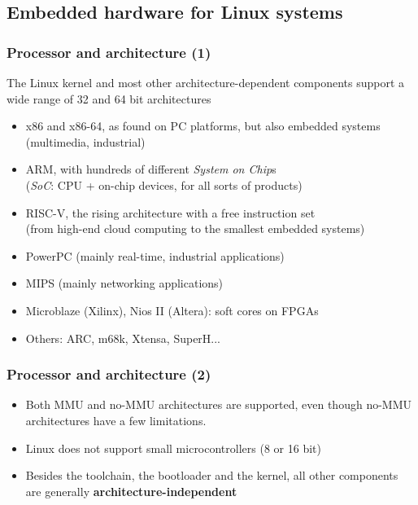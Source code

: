 \subsection{Embedded hardware for Linux systems}

\begin{frame}
  \frametitle{Processor and architecture (1)}
  The Linux kernel and most other architecture-dependent
  components support a wide range of 32 and 64 bit architectures
  \begin{itemize}
  \item x86 and x86-64, as found on PC platforms, but also embedded systems
    (multimedia, industrial)
  \item ARM, with hundreds of different {\em System on Chip}s\\
        ({\em SoC}: CPU + on-chip devices, for all sorts of products)
  \item RISC-V, the rising architecture with a free instruction set\\
        (from high-end cloud computing to the smallest embedded systems)
  \item PowerPC (mainly real-time, industrial applications)
  \item MIPS (mainly networking applications)
  \item Microblaze (Xilinx), Nios II (Altera): soft cores on FPGAs
  \item Others: ARC, m68k, Xtensa, SuperH...
  \end{itemize}
\end{frame}

\begin{frame}
  \frametitle{Processor and architecture (2)}
  \begin{itemize}
  \item Both MMU and no-MMU architectures are supported, even though
    no-MMU architectures have a few limitations.
  \item Linux does not support small microcontrollers (8 or 16 bit)
  \item Besides the toolchain, the bootloader and the kernel, all
    other components are generally {\bf architecture-independent}
  \end{itemize}
\end{frame}

